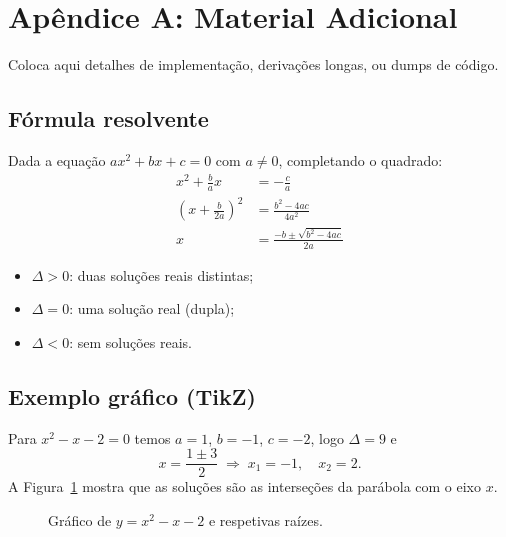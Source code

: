 \section{Apêndice A: Material Adicional}
\label{apx:extra}

Coloca aqui detalhes de implementação, derivações longas, ou dumps de código.

\subsection{Fórmula resolvente}

Dada a equação $ax^2 + bx + c = 0$ com $a \neq 0$, completando o quadrado:
\begin{align*}
  x^2 + \frac{b}{a}x &= -\frac{c}{a} \\
  \left(x + \frac{b}{2a}\right)^2 &= \frac{b^2 - 4ac}{4a^2} \\
  x &= \frac{-b \pm \sqrt{b^2 - 4ac}}{2a}
\end{align*}

\begin{itemize}
  \item $\Delta > 0$: duas soluções reais distintas;
  \item $\Delta = 0$: uma solução real (dupla);
  \item $\Delta < 0$: sem soluções reais.
\end{itemize}

\subsection{Exemplo gráfico (TikZ)}

Para $x^2 - x - 2 = 0$ temos $a=1$, $b=-1$, $c=-2$, logo $\Delta = 9$ e
\[
  x = \frac{1 \pm 3}{2} \;\Rightarrow\; x_1 = -1, \quad x_2 = 2.
\]
A Figura~\ref{fig:parabola} mostra que as soluções são as interseções da parábola com o eixo $x$.

\begin{figure}[H]
  \centering
  \caption{Gráfico de $y = x^2 - x - 2$ e respetivas raízes.}
  \label{fig:parabola}
\end{figure}
